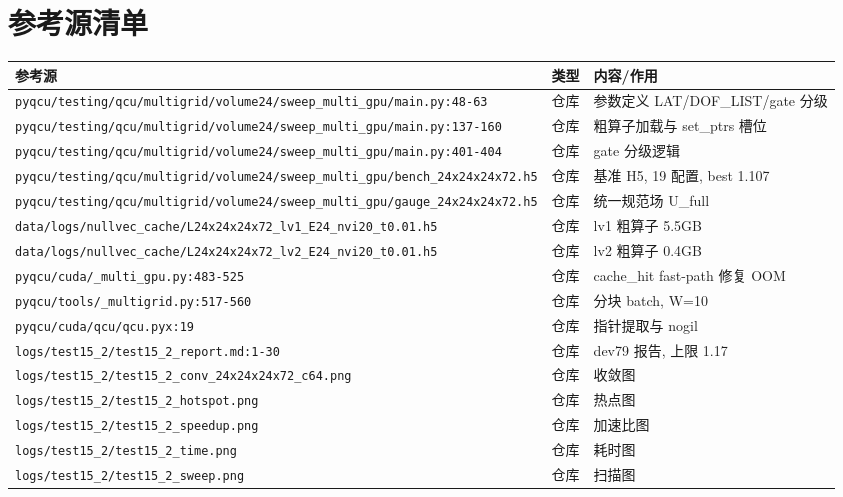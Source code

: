 \documentclass[UTF8]{ctexart}
\begin{document}
\section{参考源清单}
\begin{xltabular}{\textwidth}{llX}
\toprule
\textcolor{evidence}{参考源} & 类型 & 内容/作用 \\
\midrule
\endhead
\texttt{\nolinkurl{pyqcu/testing/qcu/multigrid/volume24/sweep_multi_gpu/main.py:48-63}} & 仓库 & 参数定义 LAT/DOF\_LIST/gate 分级 \\
\texttt{\nolinkurl{pyqcu/testing/qcu/multigrid/volume24/sweep_multi_gpu/main.py:137-160}} & 仓库 & 粗算子加载与 set\_ptrs 槽位 \\
\texttt{\nolinkurl{pyqcu/testing/qcu/multigrid/volume24/sweep_multi_gpu/main.py:401-404}} & 仓库 & gate 分级逻辑 \\
\texttt{\nolinkurl{pyqcu/testing/qcu/multigrid/volume24/sweep_multi_gpu/bench_24x24x24x72.h5}} & 仓库 & 基准 H5, 19 配置, best 1.107 \\
\texttt{\nolinkurl{pyqcu/testing/qcu/multigrid/volume24/sweep_multi_gpu/gauge_24x24x24x72.h5}} & 仓库 & 统一规范场 U\_full \\
\texttt{\nolinkurl{data/logs/nullvec_cache/L24x24x24x72_lv1_E24_nvi20_t0.01.h5}} & 仓库 & lv1 粗算子 5.5GB \\
\texttt{\nolinkurl{data/logs/nullvec_cache/L24x24x24x72_lv2_E24_nvi20_t0.01.h5}} & 仓库 & lv2 粗算子 0.4GB \\
\texttt{\nolinkurl{pyqcu/cuda/_multi_gpu.py:483-525}} & 仓库 & cache\_hit fast-path 修复 OOM \\
\texttt{\nolinkurl{pyqcu/tools/_multigrid.py:517-560}} & 仓库 & 分块 batch, W=10 \\
\texttt{\nolinkurl{pyqcu/cuda/qcu/qcu.pyx:19}} & 仓库 & 指针提取与 nogil \\
\texttt{\nolinkurl{logs/test15_2/test15_2_report.md:1-30}} & 仓库 & dev79 报告, 上限 1.17 \\
\texttt{\nolinkurl{logs/test15_2/test15_2_conv_24x24x24x72_c64.png}} & 仓库 & 收敛图 \\
\texttt{\nolinkurl{logs/test15_2/test15_2_hotspot.png}} & 仓库 & 热点图 \\
\texttt{\nolinkurl{logs/test15_2/test15_2_speedup.png}} & 仓库 & 加速比图 \\
\texttt{\nolinkurl{logs/test15_2/test15_2_time.png}} & 仓库 & 耗时图 \\
\texttt{\nolinkurl{logs/test15_2/test15_2_sweep.png}} & 仓库 & 扫描图 \\

\end{xltabular}
\end{document}
